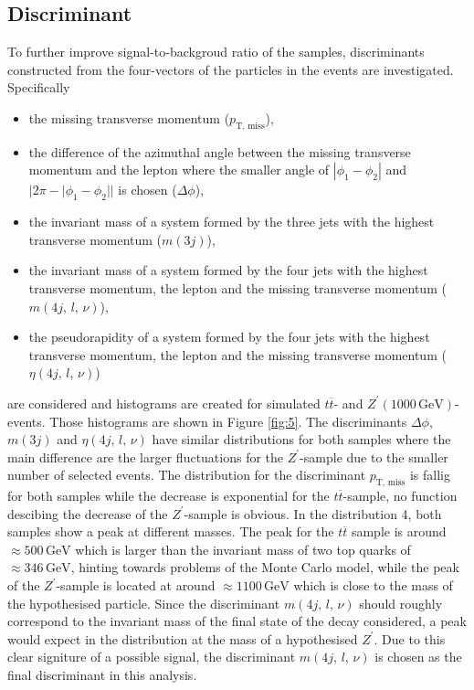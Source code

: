 \subsection{Discriminant}
To further improve signal-to-backgroud ratio of the samples, discriminants constructed from the four-vectors of the particles in the events are investigated.
Specifically
\begin{itemize}
  \item the missing transverse momentum ($p_\text{T, miss}$),
  \item the difference of the azimuthal angle between the missing transverse momentum and the lepton where the smaller angle of $|\phi_1 - \phi_2|$ and
  $|2 \pi - |\phi_1 -\phi_2||$ is chosen ($\Delta\phi$),
  \item the invariant mass of a system formed by the three jets with the highest transverse momentum ($m(3j)$),
  \item the invariant mass of a system formed by the four jets with the highest transverse momentum, the lepton and the missing transverse momentum ($m(4j,\,l,\,\nu)$),
  \item the pseudorapidity of a system formed by the four jets with the highest transverse momentum, the lepton and the missing transverse momentum ($\eta(4j,\,l,\,\nu)$)
\end{itemize}
are considered and histograms are created for simulated $t \overline{t}$- and $Z^\prime(1000 \, \si{\giga\eV})$-events. Those histograms are shown in Figure
\ref{fig:5}. The discriminants $\Delta\phi$, $m(3j)$ and $\eta(4j,\,l,\,\nu)$ have similar distributions for both samples where the main difference are the larger fluctuations
for the $Z^\prime$-sample due to the smaller number of selected events. The distribution for the discriminant $p_\text{T, miss}$ is fallig for both samples while the decrease is exponential
for the $t \overline{t}$-sample, no function descibing the decrease of the $Z^\prime$-sample is obvious. In the distribution 4, both samples show a peak
at different masses. The peak for the $t \overline{t}$ sample is around $\approx 500 \, \si{\giga\eV}$ which is larger than the invariant mass of
two top quarks of $\approx 346 \, \si{\giga\eV}$, hinting towards problems of the Monte Carlo model, while the peak of the $Z^\prime$-sample is located at around $\approx 1100 \, \si{\giga\eV}$ which is close to the mass of the
hypothesised particle. Since the discriminant $m(4j,\,l,\,\nu)$ should roughly correspond to the invariant mass of the final state of the decay considered, a peak would expect
 in the distribution at the mass of a hypothesised $Z^\prime$. Due to this clear signiture of a possible signal, the discriminant $m(4j,\,l,\,\nu)$ is chosen as
the final discriminant in this analysis.

